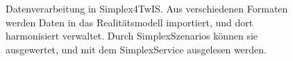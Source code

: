 \begin{figure}
{
  }
  \caption[Datenverarbeitung in Simplex4TwIS]{Datenverarbeitung in Simplex4TwIS. Aus verschiedenen Formaten werden Daten in das Realitätsmodell importiert, und dort harmonisiert verwaltet. Durch SimplexSzenarios können sie ausgewertet, und mit dem SimplexService ausgelesen werden.}
  \label{fig:s4d}
\end{figure}
